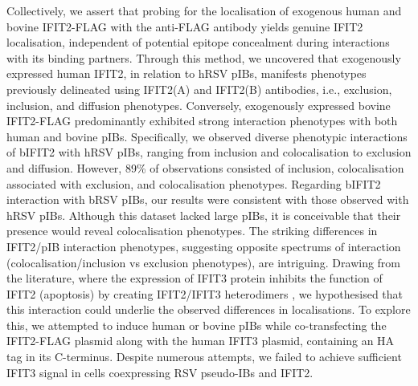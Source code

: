 Collectively, we assert that probing for the localisation of exogenous human and bovine IFIT2-FLAG with the anti-FLAG antibody yields genuine IFIT2 localisation, independent of potential epitope concealment during interactions with its binding partners. Through this method, we uncovered that exogenously expressed human IFIT2, in relation to hRSV pIBs, manifests phenotypes previously delineated using IFIT2(A) and IFIT2(B) antibodies, i.e., exclusion, inclusion, and diffusion phenotypes. Conversely, exogenously expressed bovine IFIT2-FLAG predominantly exhibited strong interaction phenotypes with both human and bovine pIBs. Specifically, we observed diverse phenotypic interactions of bIFIT2 with hRSV pIBs, ranging from inclusion and colocalisation to exclusion and diffusion. However, 89\% of observations consisted of inclusion, colocalisation associated with exclusion, and colocalisation phenotypes. Regarding bIFIT2 interaction with bRSV pIBs, our results were consistent with those observed with hRSV pIBs. Although this dataset lacked large pIBs, it is conceivable that their presence would reveal colocalisation phenotypes. The striking differences in IFIT2/pIB interaction phenotypes, suggesting opposite spectrums of interaction (colocalisation/inclusion vs exclusion phenotypes), are intriguing. Drawing from the literature, where the expression of IFIT3 protein inhibits the function of IFIT2 (apoptosis) by creating IFIT2/IFIT3 heterodimers \cite{Mears2018BetterResponse, Stawowczyk2011TheApoptosis}, we hypothesised that this interaction could underlie the observed differences in localisations. To explore this, we attempted to induce human or bovine pIBs while co-transfecting the IFIT2-FLAG plasmid along with the human IFIT3 plasmid, containing an HA tag in its C-terminus. Despite numerous attempts, we failed to achieve sufficient IFIT3 signal in cells coexpressing RSV pseudo-IBs and IFIT2.

